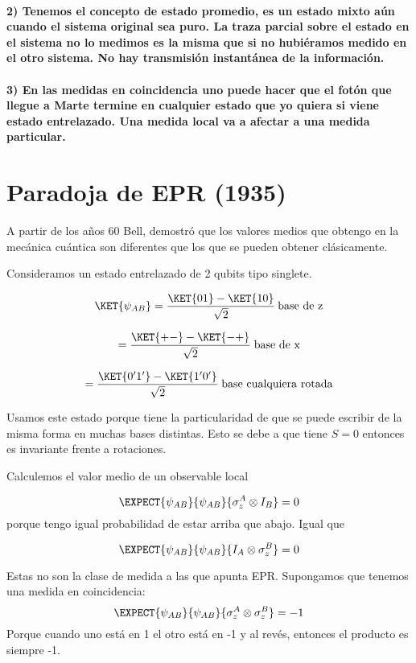 \paragraph*{2) Tenemos el concepto de estado promedio, es un estado mixto aún
cuando el sistema original sea puro. La traza parcial sobre el estado
en el sistema no lo medimos es la misma que si no hubiéramos medido
en el otro sistema. No hay transmisión instantánea de la información.}

\paragraph*{3) En las medidas en coincidencia uno puede hacer que el fotón que
llegue a Marte termine en cualquier estado que yo quiera si viene
estado entrelazado. Una medida local va a afectar a una medida particular.}

\section{Paradoja de EPR (1935)}

A partir de los años 60 Bell, demostró que los valores medios que obtengo en
la mecánica cuántica son diferentes que los que se pueden obtener clásicamente. 

Consideramos un estado entrelazado de 2 qubits tipo singlete.

\[
\KET{\psi_{AB}}=\frac{\KET{01}-\KET{10}}{\sqrt{2}}\:\text{base de z}
\]

\[
=\frac{\KET{+-}-\KET{-+}}{\sqrt{2}}\;\text{base de x}
\]

\[
=\frac{\KET{0'1'}-\KET{1'0'}}{\sqrt{2}}\;\text{base cualquiera rotada}
\]

Usamos este estado porque tiene la particularidad de que se puede
escribir de la misma forma en muchas bases distintas. Esto se debe
a que tiene $S=0$ entonces es invariante frente a rotaciones.

Calculemos el valor medio de un observable local

\[
\EXPECT{\psi_{AB}}{\psi_{AB}}{\sigma_{z}^{A}\otimes I_{B}}=0
\]
porque tengo igual probabilidad de estar arriba que abajo. Igual que 

\[
\EXPECT{\psi_{AB}}{\psi_{AB}}{I_{A}\otimes\sigma_{z}^{B}}=0
\]

Estas no son la clase de medida a las que apunta EPR. Supongamos que
tenemos una medida en coincidencia: 
\[
\EXPECT{\psi_{AB}}{\psi_{AB}}{\sigma_{z}^{A}\otimes\sigma_{z}^{B}}=-1
\]
Porque cuando uno está en 1 el otro está en -1 y al revés, entonces
el producto es siempre -1.

